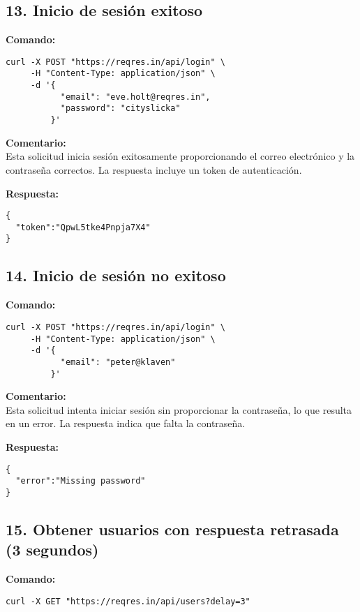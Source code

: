 \documentclass[12pt,a4paper]{article}
\begin{document}
\subsection{13. Inicio de sesión exitoso}
\textbf{Comando:}
\begin{samepage}
\begin{verbatim}
curl -X POST "https://reqres.in/api/login" \
     -H "Content-Type: application/json" \
     -d '{
           "email": "eve.holt@reqres.in",
           "password": "cityslicka"
         }'
\end{verbatim}
\end{samepage}

\textbf{Comentario:}\\
Esta solicitud inicia sesión exitosamente proporcionando el correo electrónico y la contraseña correctos. La respuesta incluye un token de autenticación.

\textbf{Respuesta:}
\begin{samepage}
\begin{verbatim}
{
  "token":"QpwL5tke4Pnpja7X4"
}
\end{verbatim}
\end{samepage}

\subsection{14. Inicio de sesión no exitoso}
\textbf{Comando:}
\begin{samepage}
\begin{verbatim}
curl -X POST "https://reqres.in/api/login" \
     -H "Content-Type: application/json" \
     -d '{
           "email": "peter@klaven"
         }'
\end{verbatim}
\end{samepage}

\textbf{Comentario:}\\
Esta solicitud intenta iniciar sesión sin proporcionar la contraseña, lo que resulta en un error. La respuesta indica que falta la contraseña.

\textbf{Respuesta:}
\begin{samepage}
\begin{verbatim}
{
  "error":"Missing password"
}
\end{verbatim}
\end{samepage}

\subsection{15. Obtener usuarios con respuesta retrasada (3 segundos)}
\textbf{Comando:}
\begin{samepage}
\begin{verbatim}
curl -X GET "https://reqres.in/api/users?delay=3"
\end{verbatim}
\end{samepage}
\end{document}
